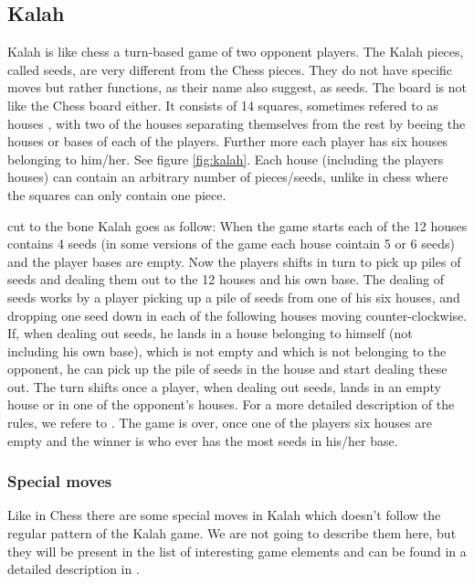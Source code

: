 \subsection{Kalah}

Kalah is like chess a turn-based game of two opponent players. The Kalah pieces, called seeds, are very different from the Chess pieces. They do not have specific moves but rather functions, as their name also suggest, as seeds. The board is not like the Chess board either. It consists of 14 squares, sometimes refered to as houses \cite{kalahrules}, with two of the houses separating themselves from the rest by beeing the houses or bases of each of the players. Further more each player has six houses belonging to him/her. See figure \ref{fig:kalah}. Each house (including the players houses) can contain an arbitrary number of pieces/seeds, unlike in chess where the squares can only contain one piece.  

cut to the bone Kalah goes as follow: When the game starts each of the 12 houses contains 4 seeds (in some versions of the game each house cointain 5 or 6 seeds) and the player bases are empty. Now the players shifts in turn to pick up piles of seeds and dealing them out to the 12 houses and his own base. The dealing of seeds works by a player picking up a pile of seeds from one of his six houses, and dropping one seed down in each of the following houses moving counter-clockwise. If, when dealing out seeds, he lands in a house belonging to himself (not including his own base), which is not empty and which is not belonging to the opponent, he can pick up the pile of seeds in the house and start dealing these out. The turn shifts once a player, when dealing out seeds, lands in an empty house or in one of the opponent's houses. For a more detailed description of the rules, we refere to \cite{kalahrules}. The game is over, once one of the players six houses are empty and the winner is who ever has the most seeds in his/her base.


\subsubsection{Special moves}
Like in Chess there are some special moves in Kalah which doesn't follow the regular pattern of the Kalah game. We are not going to describe them here, but they will be present in the list of interesting game elements and can be found in a detailed description in \cite{kalahrules}.

